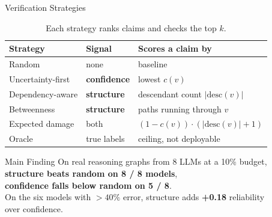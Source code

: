 \documentclass[final]{beamer}
\newcommand{\conf}[1]{\textcolor{Accent1}{\textbf{#1}}}
\newcommand{\struct}[1]{\textcolor{PrimaryBlue}{\textbf{#1}}}
\newlength{\sepwidth}
\newlength{\colwidth}
\newcommand{\separatorcolumn}{\begin{column}{\sepwidth}\end{column}}
\begin{document}
\begin{frame}[t]
\begin{columns}[t]
\begin{column}{\colwidth}
\end{column}

\separatorcolumn

\begin{column}{\colwidth}

  \begin{block}{Verification Strategies}
    \begin{table}\centering
      \caption{Each strategy ranks claims and checks the top $k$.}
      \vspace{-0.5em}
      \renewcommand{\arraystretch}{1.1}
      \begin{tabular}{@{}lll@{}}
        \toprule
        \textbf{Strategy} & \textbf{Signal} & \textbf{Scores a claim by} \\
        \midrule
        Random            & none                 & baseline \\
        Uncertainty-first & \conf{confidence}    & lowest $c(v)$ \\
        Dependency-aware  & \struct{structure}   & descendant count $|\mathrm{desc}(v)|$ \\
        Betweenness       & \struct{structure}   & paths running through $v$ \\
        Expected damage   & both                 & $(1-c(v))\cdot(|\mathrm{desc}(v)|+1)$ \\
        Oracle            & true labels          & ceiling, not deployable \\
        \bottomrule
      \end{tabular}
    \end{table}
  \end{block}

  \begin{alertblock}{Main Finding}
    \centering
    On real reasoning graphs from 8 LLMs at a 10\% budget, \\[0.3em]
    \struct{structure beats random on 8 / 8 models}, \\
    \conf{confidence falls below random on 5 / 8}. \\[0.3em]
    On the six models with $>40\%$ error, structure adds \textbf{+0.18} reliability over confidence.
  \end{alertblock}


\end{column}
\end{columns}
\end{frame}
\end{document}
